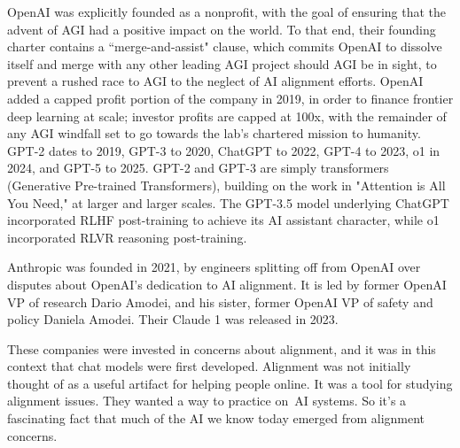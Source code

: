 OpenAI was explicitly founded as a nonprofit, with the goal of ensuring that the advent of AGI had a positive impact on the world. To that end, their founding charter contains a ``merge-and-assist" clause, which commits OpenAI to dissolve itself and merge with any other leading AGI project should AGI be in sight, to prevent a rushed race to AGI to the neglect of AI alignment efforts. OpenAI added a capped profit portion of the company in 2019, in order to finance frontier deep learning at scale; investor profits are capped at 100x, with the remainder of any AGI windfall set to go towards the lab's chartered mission to humanity. GPT-2 dates to 2019, GPT-3 to 2020, ChatGPT to 2022, GPT-4 to 2023, o1 in 2024, and GPT-5 to 2025. GPT-2 and GPT-3 are simply transformers (Generative Pre-trained Transformers), building on the work in "Attention is All You Need," at larger and larger scales. The GPT-3.5 model underlying ChatGPT incorporated RLHF post-training to achieve its AI assistant character, while o1 incorporated RLVR reasoning post-training.

Anthropic was founded in 2021, by engineers splitting off from OpenAI over disputes about OpenAI's dedication to AI alignment. It is led by former OpenAI VP of research Dario Amodei, and his sister, former OpenAI VP of safety and policy Daniela Amodei. Their Claude 1 was released in 2023.

These companies were invested in concerns about alignment, and it was in this context that chat models were first developed.  Alignment was not initially thought of as a useful artifact for helping people online.  It was a tool for studying alignment issues.  They wanted a way to practice on AI systems.  So it's a fascinating fact that much of the AI we know today emerged from alignment concerns. %



